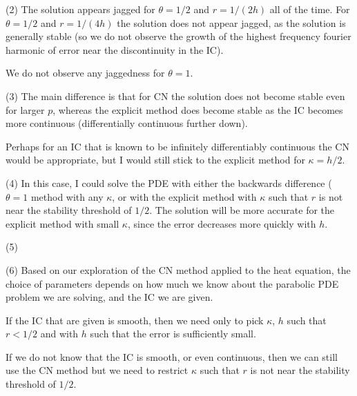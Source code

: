 \documentclass[11pt]{article}
\begin{document}
\begin{enumerate}
(2) The solution appears jagged for $\theta = 1/2$ and $r = 1/(2h)$ all of the time. For $\theta = 1/2$ and $r = 1/(4h)$ the solution does not appear jagged, as the solution is generally stable (so we do not observe the growth of the highest frequency fourier harmonic of error near the discontinuity in the IC).

We do not observe any jaggedness for $\theta = 1$.

(3) The main difference is that for CN the solution does not become stable even for larger $p$, whereas the explicit method does become stable as the IC becomes more continuous (differentially continuous further down).

Perhaps for an IC that is known to be infinitely differentiably continuous the CN would be appropriate, but I would still stick to the explicit method for $\kappa = h/2$.

(4) In this case, I could solve the PDE with either the backwards difference ($\theta  = 1$ method with any $\kappa$, or with the explicit method with $\kappa$ such that $r$ is not near the stability threshold of $1/2$.
The solution will be more accurate for the explicit method with small $\kappa$, since the error decreases more quickly with $h$.

(5) 

(6) Based on our exploration of the CN method applied to the heat equation, the choice of parameters depends on how much we know about the parabolic PDE problem we are solving, and the IC we are given.

If the IC that are given is smooth, then we need only to pick $\kappa$, $h$ such that $r<1/2$ and with $h$ such that the error is sufficiently small.

If we do not know that the IC is smooth, or even continuous, then we can still use the CN method but we need to restrict $\kappa$ such that $r$ is not near the stability threshold of $1/2$.

\end{enumerate}
\end{document}
